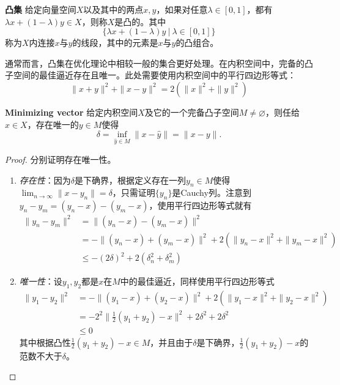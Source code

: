 \documentclass[a4paper,10pt]{ctexart}
\begin{document}
\begin{definition}{\normalfont\bf{凸集}}
    给定向量空间$ X $以及其中的两点$ x,y $，如果对任意$ \lambda\in[0,1] $，都有$ \lambda x + (1-\lambda)y\in X $，则称$ X $是凸的。其中
    \[
        \{\lambda x + (1-\lambda)y \ |\ \lambda\in [0,1]\}
    \]
    称为$ X $内连接$ x $与$ y $的线段，其中的元素是$ x $与$ y $的凸组合。
\end{definition}

通常而言，凸集在优化理论中相较一般的集合更好处理。在内积空间中，完备的凸子空间的最佳逼近存在且唯一。此处需要使用内积空间中的平行四边形等式：
\begin{equation}
    \| x + y \|^2 + \| x - y \|^2 = 2(\| x \|^2 + \| y \|^2)
\end{equation}

\begin{theorem}{\normalfont\bf{Minimizing vector}}
    给定内积空间$ X $及它的一个完备凸子空间$ M\ne\varnothing $，则任给$ x\in X $，存在唯一的$ y\in M $使得
    \[
        \delta = \inf_{\hat{y}\in M} \| x - \hat{y} \| = \| x - y \|.
    \]
\end{theorem}
\begin{proof}
    分别证明存在唯一性。
    \begin{enumerate}
        \item \emph{存在性}：因为$ \delta $是下确界，根据定义存在一列$ y_n\in M $使得$ \lim_{n \to \infty} \|x-y_n\| = \delta $，只需证明$ \{y_n\} $是Cauchy列。注意到$ y_n - y_m = (y_n - x) - (y_m - x) $，使用平行四边形等式就有
        \[
            \begin{aligned}
                \| y_n - y_m \|^2 
                &= \| (y_n - x) - (y_m - x) \|^2 \\
                &= -\| (y_n - x) + (y_m - x) \|^2 + 2(\| y_n - x \|^2 + \| y_m - x \|^2 ) \\
                &\leqslant -(2 \delta)^2 + 2(\delta_n^2 + \delta_m^2)
            \end{aligned}
        \]
        \item \emph{唯一性}：设$ y_1, y_2 $都是$ x $在$ M $中的最佳逼近，同样使用平行四边形等式
        \[
            \begin{aligned}
                \| y_1 - y_2 \|^2 
                &= -\| (y_1 - x) + (y_2 - x) \|^2 + 2(\| y_1 - x \|^2 + \| y_2 - x \|^2 ) \\
                &= -2^2 \|\frac{1}{2}(y_1+y_2) - x\|^2 + 2\delta^2 + 2\delta^2 \\
                &\leqslant 0
            \end{aligned}
        \]
        其中根据凸性$ \frac{1}{2}(y_1+y_2) - x \in M $，并且由于$ \delta $是下确界，$ \frac{1}{2}(y_1+y_2) - x $的范数不大于$ \delta $。
    \end{enumerate}
\end{proof}
\end{document}
